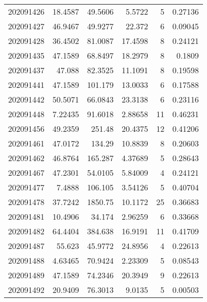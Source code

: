 \begin{tabular}{rrrrrr}
 202091426 &         18.4587  &       49.5606 &            5.5722  &           5 & 0.27136 \\
 202091427 &         46.9467  &       49.9277 &           22.372   &           6 & 0.09045 \\
 202091428 &         36.4502  &       81.0087 &           17.4598  &           8 & 0.24121 \\
 202091435 &         47.1589  &       68.8497 &           18.2979  &           8 & 0.1809  \\
 202091437 &         47.088   &       82.3525 &           11.1091  &           8 & 0.19598 \\
 202091441 &         47.1589  &      101.179  &           13.0033  &           6 & 0.17588 \\
 202091442 &         50.5071  &       66.0843 &           23.3138  &           6 & 0.23116 \\
 202091448 &          7.22435 &       91.6018 &            2.88658 &          11 & 0.46231 \\
 202091456 &         49.2359  &      251.48   &           20.4375  &          12 & 0.41206 \\
 202091461 &         47.0172  &      134.29   &           10.8839  &           8 & 0.20603 \\
 202091462 &         46.8764  &      165.287  &            4.37689 &           5 & 0.28643 \\
 202091467 &         47.2301  &       54.0105 &            5.84009 &           4 & 0.24121 \\
 202091477 &          7.4888  &      106.105  &            3.54126 &           5 & 0.40704 \\
 202091478 &         37.7242  &     1850.75   &           10.1172  &          25 & 0.36683 \\
 202091481 &         10.4906  &       34.174  &            2.96259 &           6 & 0.33668 \\
 202091482 &         64.4404  &      384.638  &           16.9191  &          11 & 0.41709 \\
 202091487 &         55.623   &       45.9772 &           24.8956  &           4 & 0.22613 \\
 202091488 &          4.63465 &       70.9424 &            2.23309 &           5 & 0.08543 \\
 202091489 &         47.1589  &       74.2346 &           20.3949  &           9 & 0.22613 \\
 202091492 &         20.9409  &       76.3013 &            9.0135  &           5 & 0.00503 \\

\end{tabular}
